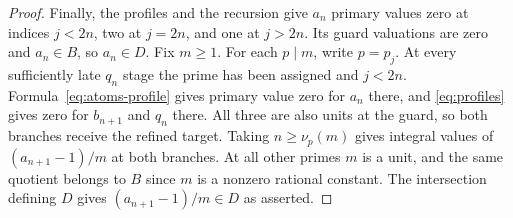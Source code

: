 \begin{proof}
    Finally, the profiles and the recursion give $a_n$ primary values zero at indices $j < 2n$, two at $j = 2n$, and one at $j > 2n$.
    Its guard valuations are zero and $a_n \in B$, so $a_n \in D$.
    Fix $m \ge 1$.
    For each $p \mid m$, write $p = p_j$.
    At every sufficiently late $q_n$ stage the prime has been assigned and $j < 2n$.
    Formula~\eqref{eq:atoms-profile} gives primary value zero for $a_n$ there, and \eqref{eq:profiles} gives zero for $b_{n + 1}$ and $q_n$ there.
    All three are also units at the guard, so both branches receive the refined target.
    Taking $n \ge \nu_p(m)$ gives integral values of $(a_{n + 1} - 1)/m$ at both branches.
    At all other primes $m$ is a unit, and the same quotient belongs to $B$ since $m$ is a nonzero rational constant.
    The intersection defining $D$ gives $(a_{n + 1} - 1)/m \in D$ as asserted.
\end{proof}
